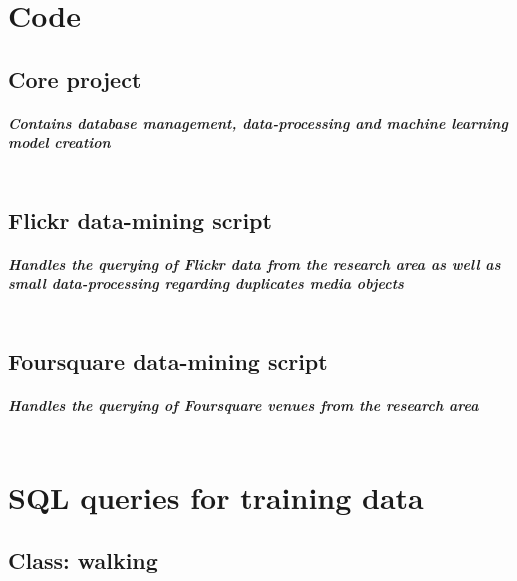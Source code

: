 \appendix

\chapter{Code} \label{python_code}

\section{Core project}
\paragraph*{Contains database management, data-processing and machine learning model creation}
\inputminted[linenos, fontsize=\tiny]{python}{code/fusion_file_appendix.py}
\clearpage

\section{Flickr data-mining script}
\paragraph*{Handles the querying of Flickr data from the research area as well as small data-processing regarding duplicates media objects}
\inputminted[linenos, fontsize=\tiny]{python}{code/flickr_mining_Kt_Zug_Appendix.py}
\clearpage

\section{Foursquare data-mining script}
\paragraph*{Handles the querying of Foursquare venues from the research area}
\inputminted[linenos, fontsize=\tiny]{python}{code/FoursquareAPI_request_Appendix.py}
\clearpage


\chapter{SQL queries for training data} \label{sql_queries_for_trainingdata}

\section{Class: walking}

\inputminted[linenos]{sql}{code/walking.txt}
\clearpage

